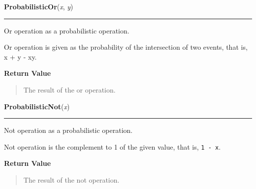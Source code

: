     \label{peach:fuzzy:norms:ProbabilisticOr}

    \vspace{0.5ex}

    \begin{boxedminipage}{\textwidth}

    \raggedright \textbf{ProbabilisticOr}(\textit{x}, \textit{y})

    \vspace{-1.5ex}

    \rule{\textwidth}{0.5\fboxrule}

Or operation as a probabilistic operation.

Or operation is given as the probability of the intersection of two events,
that is, x + y - xy.
    \vspace{1ex}

      \textbf{Return Value}
      \begin{quote}

The result of the or operation.
      \end{quote}

    \vspace{1ex}

    \end{boxedminipage}

    \label{peach:fuzzy:norms:ProbabilisticNot}

    \vspace{0.5ex}

    \begin{boxedminipage}{\textwidth}

    \raggedright \textbf{ProbabilisticNot}(\textit{x})

    \vspace{-1.5ex}

    \rule{\textwidth}{0.5\fboxrule}

Not operation as a probabilistic operation.

Not operation is the complement to 1 of the given value, that is, \texttt{1 - x}.
    \vspace{1ex}

      \textbf{Return Value}
      \begin{quote}

The result of the not operation.
      \end{quote}

    \vspace{1ex}

    \end{boxedminipage}


